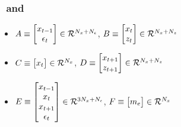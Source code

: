 \documentclass[tikz]{beamer}
\begin{document}
\begin{frame}[fragile]
  \frametitle{\ADR\ and \ADRCE}

{\small
  \begin{itemize}
  \item  $A\equiv \begin{bmatrix}  x_{t-1}\\\epsilon_t\end{bmatrix} \in 
{\mathcal{R}^{{N_x}+{N_\epsilon}}}$,
$B\equiv \begin{bmatrix}  x_{t}\\z_t\end{bmatrix} \in 
{\mathcal{R}^{{N_x}+{N_z}}}$
   \item  $C\equiv \begin{bmatrix}  x_{t} \end{bmatrix}\in 
 {\mathcal{R}^{{N_x}}}$,
 $D\equiv \begin{bmatrix}  x_{t+1}\\z_{t+1}\end{bmatrix} \in 
 {\mathcal{R}^{{N_x}+{N_z}}}$
\item $E\equiv \begin{bmatrix}  x_{t-1}\\ x_{t}\\ x_{t+1}\\ \epsilon_t \end{bmatrix}\in 
 {\mathcal{R}^{3{N_x}+{N_\epsilon}}}$,
$F\equiv \begin{bmatrix}  {{m}_e} \end{bmatrix}\in 
 {\mathcal{R}^{{N_x}}}$
  \end{itemize}



}

\end{frame}
\end{document}
